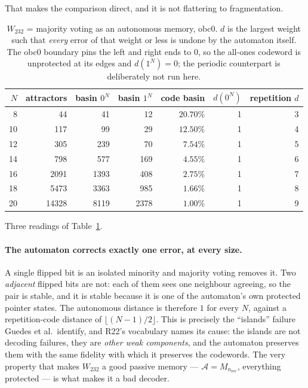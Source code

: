 \documentclass[11pt]{article}
\theoremstyle{plain}
\theoremstyle{definition}
\theoremstyle{remark}
\begin{document}
That makes the comparison direct, and it is not flattering to fragmentation.

\begin{table}[htbp]
\centering
\caption{$W_{232}$ = majority voting as an autonomous memory, obc0. $d$ is the
largest weight such that \emph{every} error of that weight or less is undone by
the automaton itself. The obc0 boundary pins the left and right ends to $0$, so
the all-ones codeword is unprotected at its edges and $d(1^N) = 0$; the
periodic counterpart is deliberately not run here.}
\label{tab:memory}
\begin{tabular}{rrrrrrr}
\toprule
$N$ & attractors & basin $0^N$ & basin $1^N$ & code basin & $d(0^N)$ &
repetition $d$ \\
\midrule
 8 &    44 &   41 &   12 & $20.70\%$ & 1 & 3 \\
10 &   117 &   99 &   29 & $12.50\%$ & 1 & 4 \\
12 &   305 &  239 &   70 & $\phantom{0}7.54\%$ & 1 & 5 \\
14 &   798 &  577 &  169 & $\phantom{0}4.55\%$ & 1 & 6 \\
16 &  2091 & 1393 &  408 & $\phantom{0}2.75\%$ & 1 & 7 \\
18 &  5473 & 3363 &  985 & $\phantom{0}1.66\%$ & 1 & 8 \\
20 & 14328 & 8119 & 2378 & $\phantom{0}1.00\%$ & 1 & 9 \\
\bottomrule
\end{tabular}
\end{table}

Three readings of Table~\ref{tab:memory}.

\paragraph{The automaton corrects exactly one error, at every size.} A single
flipped bit is an isolated minority and majority voting removes it. Two
\emph{adjacent} flipped bits are not: each of them sees one neighbour agreeing,
so the pair is stable, and it is stable because it is one of the automaton's own
protected pointer states. The autonomous distance is therefore $1$ for every
$N$, against a repetition-code distance of $\lfloor (N-1)/2 \rfloor$. This is
precisely the ``islands'' failure Guedes et al.\ identify, and R22's vocabulary
names its cause: the islands are not decoding failures, they are \emph{other
weak components}, and the automaton preserves them with the same fidelity with
which it preserves the codewords. The very property that makes $W_{232}$ a good
passive memory --- $\mathcal{A} = M_{n_{\mathrm{rec}}}$, everything protected
--- is what makes it a bad decoder.
\end{document}
